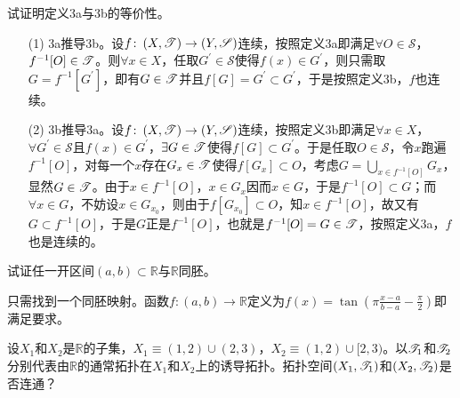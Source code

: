 \begin{xiti}
	\item 试证明定义3a与3b的等价性。
	
	\begin{zm}
		\begin{enumerate}
			\item[(1)] 3a推导3b。设$f\colon \left(X,\mathscr{T} \right)\rightarrow\left(Y,\mathscr{S}\right) $连续，按照定义3a即满足$\forall O\in\mathscr{S} $，$f^{-1}[O]\in\mathscr{T} $。则$\forall x\in X$，任取$G^\prime\in\mathscr{S} $使得$f(x)\in G^\prime $，则只需取$G=f^{-1}[G^\prime] $，即有$G\in\mathscr{T} $并且$f[G]=G^\prime \subset G^\prime $，于是按照定义3b，$f$也连续。
			\item[(2)] 3b推导3a。设$f\colon \left(X,\mathscr{T} \right)\rightarrow\left(Y,\mathscr{S}\right) $连续，按照定义3b即满足$\forall x\in X $，$\forall G^\prime\in \mathscr{S} $且$f(x)\in G^\prime $，$\exists G\in \mathscr{T} $使得$f[G]\subset G^\prime $。于是任取$O\in \mathscr{S} $，令$x$跑遍$f^{-1}[O]$，对每一个$x$存在$G_x\in \mathscr{T}$使得$f[G_x]\subset O $，考虑$\displaystyle G=\bigcup_{x\in f^{-1}[O]} G_x $，显然$G\in\mathscr{T} $。由于$x\in f^{-1}[O] $，$x\in G_x $因而$x\in G $，于是$f^{-1}[O]\subset G $；而$\forall x\in G $，不妨设$x\in G_{x_0}$，则由于$f[G_{x_0}]\subset O $，知$x\in f^{-1}[O] $，故又有$G\subset f^{-1}[O] $，于是$G$正是$f^{-1}[O] $，也就是$f^{-1}[O]=G\in \mathscr{T} $，按照定义3a，$f$也是连续的。
			
		\end{enumerate}
	\end{zm}
	
	\item 试证任一开区间$(a,b)\subset \mathbb{R} $与$\mathbb{R} $同胚。
	
	\begin{zm}
		只需找到一个同胚映射。函数$f\colon (a,b)\rightarrow \mathbb{R} $定义为$\displaystyle f(x)=\tan(\pi\frac{x-a}{b-a}-\frac{\pi}{2}) $即满足要求。
	\end{zm}
	
	\item 设$X_1 $和$X_2$是$\mathbb{R}$的子集，$X_1\equiv(1,2)\cup(2,3) $，$X_2\equiv(1,2)\cup[2,3)$。以$\mathscr{T}_1$和$\mathscr{T}_2$分别代表由$\mathbb{R}$的通常拓扑在$X_1$和$X_2$上的诱导拓扑。拓扑空间$(X_1,\mathscr{T}_1)$和$(X_2,\mathscr{T}_2)$是否连通？
	

\end{xiti}
